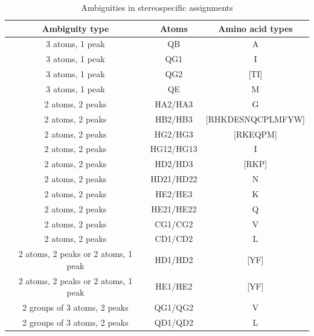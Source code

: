 \begin{table}
  \begin{tabular}{ | c | c | c |}
    \hline
    Ambiguity type    &  Atoms        &  Amino acid types     \\  \hline 
    3 atoms, 1 peak   &  QB           &  A                    \\  \hline 
    3 atoms, 1 peak   &  QG1          &  I                    \\  \hline 
    3 atoms, 1 peak   &  QG2          &  [TI]                 \\  \hline 
    3 atoms, 1 peak   &  QE           &  M                    \\  \hline 
    2 atoms, 2 peaks  &  HA2/HA3      &  G                    \\  \hline 
    2 atoms, 2 peaks  &  HB2/HB3      &  [RHKDESNQCPLMFYW]    \\  \hline 
    2 atoms, 2 peaks  &  HG2/HG3      &  [RKEQPM]             \\  \hline 
    2 atoms, 2 peaks  &  HG12/HG13    &  I                    \\  \hline 
    2 atoms, 2 peaks  &  HD2/HD3      &  [RKP]                \\  \hline 
    2 atoms, 2 peaks  &  HD21/HD22    &  N                    \\  \hline 
    2 atoms, 2 peaks  &  HE2/HE3      &  K                    \\  \hline 
    2 atoms, 2 peaks  &  HE21/HE22    &  Q                    \\  \hline 
    2 atoms, 2 peaks  &  CG1/CG2      &  V                    \\  \hline 
    2 atoms, 2 peaks  &  CD1/CD2      &  L                    \\  \hline 
    2 atoms, 2 peaks or 2 atoms, 1 peak  &  HD1/HD2  &  [YF]  \\  \hline 
    2 atoms, 2 peaks or 2 atoms, 1 peak  &  HE1/HE2  &  [YF]  \\  \hline 
    2 groups of 3 atoms, 2 peaks  &  QG1/QG2  &  V            \\  \hline
    2 groups of 3 atoms, 2 peaks  &  QD1/QD2  &  L            \\  \hline
  \end{tabular}
  \caption{Ambiguities in stereospecific assignments}
  \label{stereospecific_ambiguities}
\end{table}

